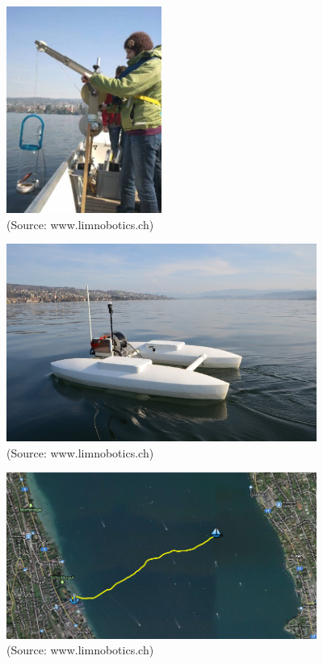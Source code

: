 \documentclass[10pt]{beamer}
\begin{document}
\begin{frame}
\begin{center}
\vspace{0.2in}
\includegraphics[width=2in]{figures/manual.jpg}\\
{\tiny (Source: www.limnobotics.ch)}
\end{center}
\end{frame}

\begin{frame}
\begin{center}
\vspace{0.2in}
\includegraphics[width=4in]{figures/boat.jpg}\\
{\tiny (Source: www.limnobotics.ch)}
\end{center}
\end{frame}

\begin{frame}
\begin{center}
\vspace{0.2in}
\includegraphics[width=4in]{figures/lake.png}\\
{\tiny (Source: www.limnobotics.ch)}
\end{center}
\end{frame}
\end{document}
